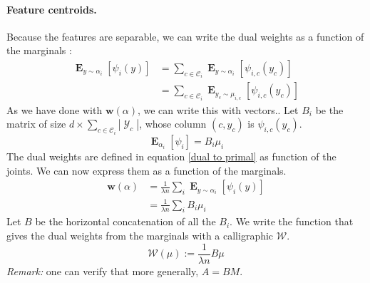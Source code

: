 \documentclass{article}
\DeclareMathOperator{\1}{\mathbb{1}}
\DeclareMathOperator{\E}{\mathbf{E}}
\DeclareMathOperator{\Y}{\mathcal{Y}}
\begin{document}
\paragraph{Feature centroids.}
Because the features are separable, we can write the dual weights as a function of the marginals :
\begin{align*}
	\E_{y \sim \alpha_i}[\psi_i(y)]
   	&  = \sum_{c \in \mathcal C_i} \E_{y \sim \alpha_i}  [\psi_{i, c}(y_c)]  \\
   	&  = \sum_{c \in \mathcal C_i} \E_{y_c \sim \mu_{i, c}}  [\psi_{i, c}(y_c)] 
\end{align*}
As we have done with $\bm w(\alpha)$, we can write this with vectors..
Let  $B_i$ be the matrix of size $d \times  \sum_{c \in \mathcal C_i} |\Y_c|$, whose column $(c, y_c)$ is $\psi_{i, c}(y_c)$.
\begin{equation*}
	 \E_{\alpha_i}[\psi_i] = B_i \mu_i
\end{equation*}
The dual weights are defined in equation \ref{dual to primal} as function of the joints. We can now express them as a function of the marginals.
\begin{align*}
	\bm w (\alpha)
	& =\frac{1}{\lambda n} \sum_i \E_{y \sim \alpha_i}[\psi_i(y)] \\
	& = \frac{1}{\lambda n} \sum_i B_i \mu_i
\end{align*}
Let $B$ be the horizontal concatenation of all the $B_i$. We write the function that gives the dual weights from the marginals with a calligraphic $\mathcal W$.
\begin{equation}
	\label{marginals to primal}
	\mathcal W (\mu) := \frac{1}{\lambda n} B \mu
\end{equation}
\textit{Remark:} one can verify that more generally, $A=BM$.
\end{document}
